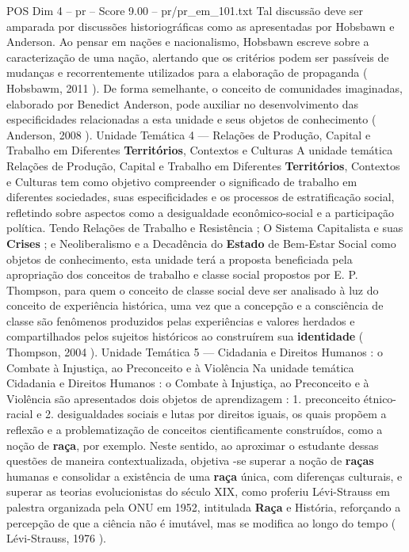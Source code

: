 \begin{textsample}{POS Dim 4 – pr – Score 9.00 – pr/pr\_em\_101.txt}
Tal discussão deve ser amparada por discussões historiográficas como as apresentadas por Hobsbawn e Anderson.
Ao pensar em nações e nacionalismo, Hobsbawn escreve sobre a caracterização de uma nação, alertando que os critérios podem ser passíveis de mudanças e recorrentemente utilizados para a elaboração de propaganda ( Hobsbawm, 2011 ).
De forma semelhante, o conceito de comunidades imaginadas, elaborado por Benedict Anderson, pode auxiliar no desenvolvimento das especificidades relacionadas a esta unidade e seus objetos de conhecimento ( Anderson, 2008 ).
Unidade Temática 4 — Relações de Produção, Capital e Trabalho em Diferentes \textbf{Territórios}, Contextos e Culturas A unidade temática Relações de Produção, Capital e Trabalho em Diferentes \textbf{Territórios}, Contextos e Culturas tem como objetivo compreender o significado de trabalho em diferentes sociedades, suas especificidades e os processos de estratificação social, refletindo sobre aspectos como a desigualdade econômico-social e a participação política.
Tendo Relações de Trabalho e Resistência ; O Sistema Capitalista e suas \textbf{Crises} ; e Neoliberalismo e a Decadência do \textbf{Estado} de Bem-Estar Social como objetos de conhecimento, esta unidade terá a proposta beneficiada pela apropriação dos conceitos de trabalho e classe social propostos por E.
P.
Thompson, para quem o conceito de classe social deve ser analisado à luz do conceito de experiência histórica, uma vez que a concepção e a consciência de classe são fenômenos produzidos pelas experiências e valores herdados e compartilhados pelos sujeitos históricos ao construírem sua \textbf{identidade} ( Thompson, 2004 ).
Unidade Temática 5 — Cidadania e Direitos Humanos : o Combate à Injustiça, ao Preconceito e à Violência Na unidade temática Cidadania e Direitos Humanos : o Combate à Injustiça, ao Preconceito e à Violência são apresentados dois objetos de aprendizagem : 1. preconceito étnico-racial e 2. desigualdades sociais e lutas por direitos iguais, os quais propõem a reflexão e a problematização de conceitos cientificamente construídos, como a noção de \textbf{raça}, por exemplo.
Neste sentido, ao aproximar o estudante dessas questões de maneira contextualizada, objetiva -se superar a noção de \textbf{raças} humanas e consolidar a existência de uma \textbf{raça} única, com diferenças culturais, e superar as teorias evolucionistas do século XIX, como proferiu Lévi-Strauss em palestra organizada pela ONU em 1952, intitulada \textbf{Raça} e História, reforçando a percepção de que a ciência não é imutável, mas se modifica ao longo do tempo ( Lévi-Strauss, 1976 ).

\end{textsample}
